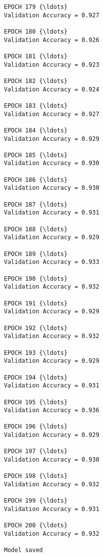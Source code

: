 \documentclass[11pt]{article}
\begin{document}
\begin{Verbatim}[commandchars=\\\{\}]
EPOCH 179 {\ldots}
Validation Accuracy = 0.927

EPOCH 180 {\ldots}
Validation Accuracy = 0.926

EPOCH 181 {\ldots}
Validation Accuracy = 0.923

EPOCH 182 {\ldots}
Validation Accuracy = 0.924

EPOCH 183 {\ldots}
Validation Accuracy = 0.927

EPOCH 184 {\ldots}
Validation Accuracy = 0.929

EPOCH 185 {\ldots}
Validation Accuracy = 0.930

EPOCH 186 {\ldots}
Validation Accuracy = 0.930

EPOCH 187 {\ldots}
Validation Accuracy = 0.931

EPOCH 188 {\ldots}
Validation Accuracy = 0.929

EPOCH 189 {\ldots}
Validation Accuracy = 0.933

EPOCH 190 {\ldots}
Validation Accuracy = 0.932

EPOCH 191 {\ldots}
Validation Accuracy = 0.929

EPOCH 192 {\ldots}
Validation Accuracy = 0.932

EPOCH 193 {\ldots}
Validation Accuracy = 0.929

EPOCH 194 {\ldots}
Validation Accuracy = 0.931

EPOCH 195 {\ldots}
Validation Accuracy = 0.936

EPOCH 196 {\ldots}
Validation Accuracy = 0.929

EPOCH 197 {\ldots}
Validation Accuracy = 0.930

EPOCH 198 {\ldots}
Validation Accuracy = 0.932

EPOCH 199 {\ldots}
Validation Accuracy = 0.931

EPOCH 200 {\ldots}
Validation Accuracy = 0.932

Model saved

    \end{Verbatim}
\end{document}
